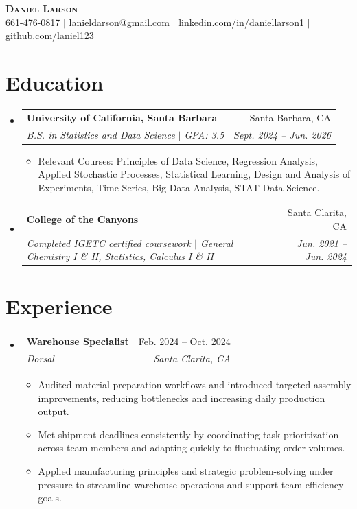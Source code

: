 \documentclass[letterpaper,11pt]{article}
\makeatletter
\newcommand{\resumeItem}[1]{
  \item\small{
    {#1 \vspace{-2pt}}
  }
}
\newcommand{\resumeSubheading}[4]{
  \vspace{-2pt}\item
    \begin{tabular*}{0.97\textwidth}[t]{l@{\extracolsep{\fill}}r}
      \textbf{#1} & #2 \\
      \textit{\small#3} & \textit{\small #4} \\
    \end{tabular*}\vspace{-7pt}
}
\newcommand{\resumeSubHeadingListStart}{\begin{itemize}[leftmargin=0.15in, label={}]}
\newcommand{\resumeSubHeadingListEnd}{\end{itemize}}
\newcommand{\resumeItemListStart}{\begin{itemize}}
\newcommand{\resumeItemListEnd}{\end{itemize}\vspace{-5pt}}
\makeatother
\begin{document}
 
\begin{center}
    \textbf{\fontsize{16}{18}\selectfont \scshape Daniel Larson} \\ \vspace{1pt}
    \small 661-476-0817 $|$ \href{mailto:lanieldarson@gmail.com}{\underline{lanieldarson@gmail.com}} $|$
    \href{https://www.linkedin.com/in/daniellarson1}{\underline{linkedin.com/in/daniellarson1}} $|$
    \href{https://github.com/laniel123}{\underline{github.com/laniel123}}
\end{center}
 
\section{Education}
  \resumeSubHeadingListStart
    \resumeSubheading
      {University of California, Santa Barbara}{Santa Barbara, CA}
      {B.S. in Statistics and Data Science $|$ GPA: 3.5}{Sept. 2024 -- Jun. 2026}
      \resumeItemListStart
        \resumeItem{Relevant Courses: Principles of Data Science, Regression Analysis, 
        Applied Stochastic Processes, Statistical Learning, Design and Analysis of Experiments, 
        Time Series, Big Data Analysis, STAT Data Science.}
      \resumeItemListEnd
      \resumeSubheading
      {College of the Canyons}{Santa Clarita, CA}
      {Completed IGETC certified coursework $|$ General Chemistry I \& II, Statistics, Calculus I \& II}{Jun. 2021 -- Jun. 2024}
      \resumeSubHeadingListEnd
      
\section{Experience}
  \resumeSubHeadingListStart
    \resumeSubheading
      {Warehouse Specialist}{Feb. 2024 -- Oct. 2024}
      {Dorsal}{Santa Clarita, CA}
      \resumeItemListStart
        \resumeItem{Audited material preparation workflows and introduced targeted assembly improvements, reducing bottlenecks and increasing daily production output.}
        \resumeItem{Met shipment deadlines consistently by coordinating task prioritization across team members and adapting quickly to fluctuating order volumes.}
        \resumeItem{Applied manufacturing principles and strategic problem-solving under pressure to streamline warehouse operations and support team efficiency goals.}
      \resumeItemListEnd
  \resumeSubHeadingListEnd

\end{document}
